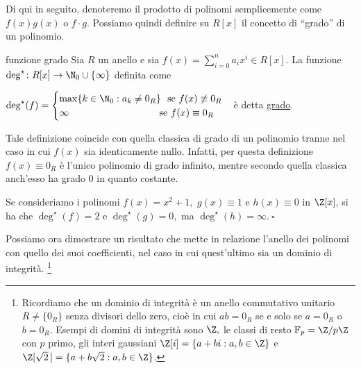 \vspace{1.5mm}

\noindent Di qui in seguito, denoteremo il prodotto di polinomi semplicemente come $f(x)g(x)$ o $f\cdot g$.
\noindent Possiamo quindi definire su $R[x]$ il concetto di ``grado'' di un polinomio.


\begin{defn}{funzione grado}
Sia $R$ un anello e sia $f(x)=\sum\limits_{i=0}^n a_i x^i\in R[x]$. 
La funzione $\deg^{\star}\colon R[x]\to \N_0\cup \{\infty\}$ definita come 

$\deg^{\star}(f)=\begin{cases} \max\{k\in \N_0: a_k\neq 0_R\} 
\text{ \ se }f(x)\not\equiv 0_R \\ \infty 
\text{ \ \ \ \ \ \ \ \ \ \ \ \ \ \ \ \ \ \ \ \ \ \ \ \ \ \ \ se } 
f(x)\equiv 0_R\end{cases}$è detta \underline{grado}.\footnotemark
\end{defn}


\noindent Tale definizione coincide con quella classica di grado di un polinomio tranne nel caso in cui 
$f(x)$ sia identicamente nullo. Infatti, per questa definizione $f(x)\equiv 0_R$ è l'unico polinomio di grado infinito, 
mentre secondo quella classica anch'esso ha grado $0$ in quanto costante. 

\begin{exm}Se consideriamo i polinomi $f(x)=x^2+1,$ $g(x)\equiv 1$ e $h(x)\equiv 0$ in $\Z[x]$, 
si ha che $\deg^{\star}(f)=2$ e $\deg^{\star}(g)=0,$ ma $\deg^{\star}(h)=\infty. \ \square$\end{exm}

\noindent Possiamo ora dimostrare un risultato che mette in relazione l'anello dei polinomi con quello dei suoi coefficienti, 
nel caso in cui quest'ultimo sia un dominio di integrità.
\footnote{Ricordiamo che un dominio di integrità è un anello commutativo unitario $R\neq \{0_R\}$ senza divisori dello zero, 
cioè in cui $ab=0_R$ se e solo se $a=0_R$ o $b=0_R$. Esempi di domini di integrità sono $\Z,$ 
le classi di resto $\mathbb{F}_p=\Z/p\Z$ con $p$ primo, gli interi gaussiani
$\Z[i]=\left\{a+bi: a,b\in\Z\right\}$ e $\Z[\sqrt{2}\,]=\{a+b\sqrt{2}: a,b\in \Z\}$.}

